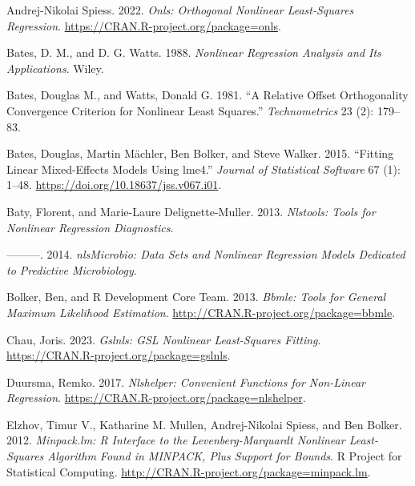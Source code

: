 \hypertarget{refs}{}
\begin{CSLReferences}{1}{0}
\leavevmode{}%
Andrej-Nikolai Spiess. 2022. \emph{Onls: Orthogonal Nonlinear Least-Squares Regression}. \url{https://CRAN.R-project.org/package=onls}.

\leavevmode{}%
Bates, D. M., and D. G. Watts. 1988. \emph{Nonlinear Regression Analysis and Its Applications}. Wiley.

\leavevmode{}%
Bates, Douglas M., and Watts, Donald G. 1981. {``A Relative Offset Orthogonality Convergence Criterion for Nonlinear Least Squares.''} \emph{Technometrics} 23 (2): 179--83.

\leavevmode{}%
Bates, Douglas, Martin Mächler, Ben Bolker, and Steve Walker. 2015. {``Fitting Linear Mixed-Effects Models Using {lme4}.''} \emph{Journal of Statistical Software} 67 (1): 1--48. \url{https://doi.org/10.18637/jss.v067.i01}.

\leavevmode{}%
Baty, Florent, and Marie-Laure Delignette-Muller. 2013. \emph{Nlstools: Tools for Nonlinear Regression Diagnostics}.

\leavevmode{}%
---------. 2014. \emph{nlsMicrobio: Data Sets and Nonlinear Regression Models Dedicated to Predictive Microbiology}.

\leavevmode{}%
Bolker, Ben, and R Development Core Team. 2013. \emph{Bbmle: Tools for General Maximum Likelihood Estimation}. \url{http://CRAN.R-project.org/package=bbmle}.

\leavevmode{}%
Chau, Joris. 2023. \emph{Gslnls: GSL Nonlinear Least-Squares Fitting}. \url{https://CRAN.R-project.org/package=gslnls}.

\leavevmode{}%
Duursma, Remko. 2017. \emph{Nlshelper: Convenient Functions for Non-Linear Regression}. \url{https://CRAN.R-project.org/package=nlshelper}.

\leavevmode{}%
Elzhov, Timur V., Katharine M. Mullen, Andrej-Nikolai Spiess, and Ben Bolker. 2012. \emph{Minpack.lm: R Interface to the Levenberg-Marquardt Nonlinear Least-Squares Algorithm Found in MINPACK, Plus Support for Bounds}. R Project for Statistical Computing. \url{http://CRAN.R-project.org/package=minpack.lm}.


\end{CSLReferences}
